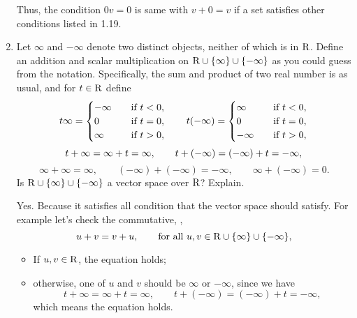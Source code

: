 \begin{enumerate}
\begin{solution}
            Thus, the condition $0v = 0$ is same with $v + 0 = v$ if a set satisfies other conditions listed in 1.19.
        \end{solution}
    \item Let $\infty$ and $-\infty$ denote two distinct objects, neither of which is in $\mathrm{R}$. Define an 
        addition and scalar multiplication on $\mathrm{R} \cup \{\infty\} \cup \{-\infty\}$ as you could guess 
        from the notation. Specifically, the sum and product of two real number is as usual, and for 
        $t \in \mathrm{R}$ define 
        \[ t \infty = 
            \begin{cases}
                -\infty \quad& \text{if $t < 0$}, \\
                0 \quad& \text{if $t=0$}, \\
                \infty \quad& \text{if $t>0$},
            \end{cases} \qquad 
            t(-\infty) = 
            \begin{cases}
                \infty \quad& \text{if $t < 0$}, \\
                0 \quad& \text{if $t = 0$}, \\
                -\infty \quad& \text{if $t > 0$},
            \end{cases} \\
        \]
        \[
            t+\infty = \infty + t = \infty, \qquad t + (-\infty) = (-\infty) + t = -\infty, \\
        \]
        \[
            \infty + \infty = \infty, \qquad (-\infty) + (-\infty) = -\infty, \qquad \infty + (-\infty) = 0.
        \]
        Is $\mathrm{R} \cup \{\infty\} \cup \{-\infty\}$ a vector space over $\mathrm{R}$? Explain.
        \begin{solution}
            Yes. Because it satisfies all condition that the vector space should satisfy. For example let's check the commutative, 
            \ie, 
            \[ u + v = v + u, \qquad \text{for all $u,v \in \mathrm{R} \cup \{\infty\} \cup \{-\infty\}$},\]
            \begin{itemize}
                \item If $u, v \in \mathrm{R}$, the equation holds;
                \item otherwise, one of $u$ and $v$ should be $\infty$ or $-\infty$, since we have 
                    \[t+\infty = \infty + t = \infty, \qquad t + (-\infty) = (-\infty) + t = -\infty,\]
                    which means the equation holds.
            \end{itemize}

        \end{solution}
\end{enumerate}


